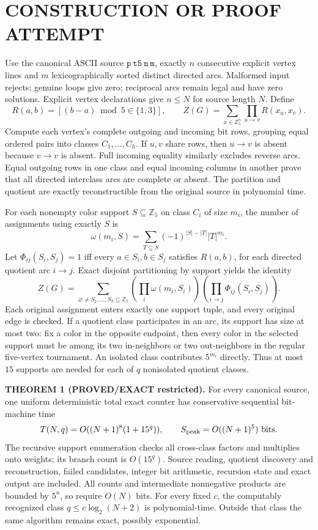 \documentclass[11pt]{article}
\begin{document}
\section{CONSTRUCTION OR PROOF ATTEMPT}
Use the canonical ASCII source $\mathtt{p\ t5\ n\ m}$, exactly $n$ consecutive explicit vertex lines and $m$ lexicographically sorted distinct directed arcs. Malformed input rejects; genuine loops give zero; reciprocal arcs remain legal and have zero solutions. Explicit vertex declarations give $n\le N$ for source length $N$. Define
\[
R(a,b)=[(b-a)\bmod5\in\{1,3\}],\qquad
Z(G)=\sum_{x\in\mathbb Z_5^n}\prod_{u\to v} R(x_u,x_v).
\]
Compute each vertex's complete outgoing and incoming bit rows, grouping equal ordered pairs into classes $C_1,\ldots,C_h$. If $u,v$ share rows, then $u\to v$ is absent because $v\to v$ is absent. Full incoming equality similarly excludes reverse arcs. Equal outgoing rows in one class and equal incoming columns in another prove that all directed interclass arcs are complete or absent. The partition and quotient are exactly reconstructible from the original source in polynomial time.

For each nonempty color support $S\subseteq\mathbb Z_5$ on class $C_i$ of size $m_i$, the number of assignments using exactly $S$ is
\[
\omega(m_i,S)=\sum_{T\subseteq S}(-1)^{|S|-|T|}|T|^{m_i}.
\]
Let $\Phi_{ij}(S_i,S_j)=1$ iff every $a\in S_i,b\in S_j$ satisfies $R(a,b)$, for each directed quotient arc $i\to j$. Exact disjoint partitioning by support yields the identity
\[
Z(G)=\sum_{\varnothing\ne S_1,\ldots,S_h\subseteq\mathbb Z_5}
\left(\prod_i\omega(m_i,S_i)\right)
\left(\prod_{i\to j}\Phi_{ij}(S_i,S_j)\right).
\]
Each original assignment enters exactly one support tuple, and every original edge is checked. If a quotient class participates in an arc, its support has size at most two: fix a color in the opposite endpoint, then every color in the selected support must be among its two in-neighbors or two out-neighbors in the regular five-vertex tournament. An isolated class contributes $5^{m_i}$ directly. Thus at most $15$ supports are needed for each of $q$ nonisolated quotient classes.

\textbf{THEOREM 1 (PROVED/EXACT restricted).} For every canonical source, one uniform deterministic total exact counter has conservative sequential bit-machine time
\[
T(N,q)=O((N+1)^8(1+15^q)),\qquad
S_{\rm peak}=O((N+1)^5)\text{ bits}.
\]
The recursive support enumeration checks all cross-class factors and multiplies onto weights; its branch count is $O(15^q)$. Source reading, quotient discovery and reconstruction, failed candidates, integer bit arithmetic, recursion state and exact output are included. All counts and intermediate nonnegative products are bounded by $5^n$, so require $O(N)$ bits. For every fixed $c$, the computably recognized class $q\le c\log_2(N+2)$ is polynomial-time. Outside that class the same algorithm remains exact, possibly exponential.
\end{document}
